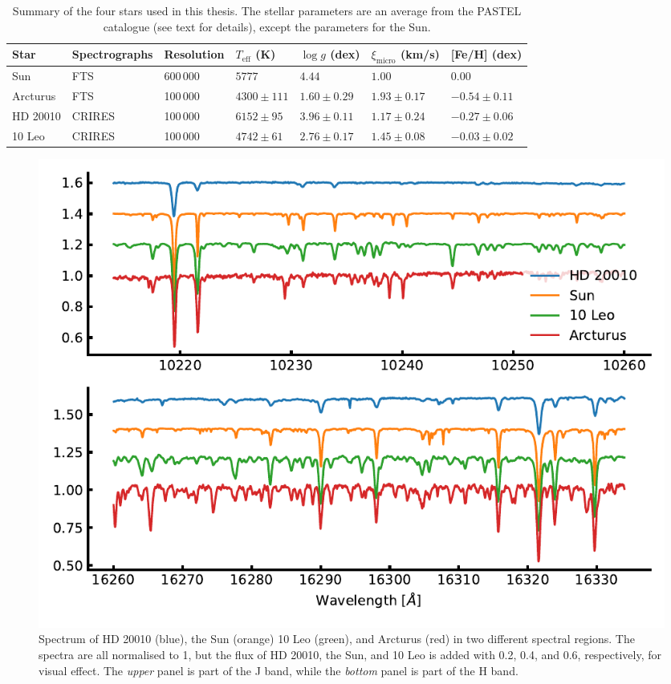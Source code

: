 \begin{table}[htb!]
    \caption{Summary of the four stars used in this thesis. The stellar parameters are an average
             from the PASTEL catalogue \citep{Soubiran2016} (see text for details), except the
             parameters for the Sun.}
    \label{tab:stars}
    \centering
    \begin{tabular}{lllllll}
      \hline\hline
        Star        & Spectrographs  & Resolution  & $T_\mathrm{eff}$ (K) &  $\log g$ (dex)  &   $\xi_\mathrm{micro}$ (km/s)   & [Fe/H] (dex)      \\
      \hline
        Sun         & FTS            & 600\,000    & $5777$               &  $4.44$          &    $1.00$                       & $ 0.00$          \\
        Arcturus    & FTS            & 100\,000    & $4300 \pm 111$       &  $1.60 \pm 0.29$ &    $1.93 \pm 0.17$              & $-0.54 \pm 0.11$ \\
        HD 20010    & CRIRES         & 100\,000    & $6152 \pm  95$       &  $3.96 \pm 0.11$ &    $1.17 \pm 0.24$              & $-0.27 \pm 0.06$ \\
        10 Leo      & CRIRES         & 100\,000    & $4742 \pm  61$       &  $2.76 \pm 0.17$ &    $1.45 \pm 0.08$              & $-0.03 \pm 0.02$ \\
      \hline
    \end{tabular}
\end{table}

\begin{figure}[htpb!]
    \centering
    \includegraphics[width=1.0\linewidth]{figures/NIRspectra.pdf}
    \caption{Spectrum of HD 20010 (blue), the Sun (orange) 10 Leo (green), and Arcturus (red) in two
             different spectral regions. The spectra are all normalised to 1, but the flux of
             HD 20010, the Sun, and 10 Leo is added with 0.2, 0.4, and 0.6, respectively, for visual
             effect. The \emph{upper} panel is part of the J band, while the \emph{bottom} panel is
             part of the H band.}
    \label{fig:NIRspectra}
\end{figure}


